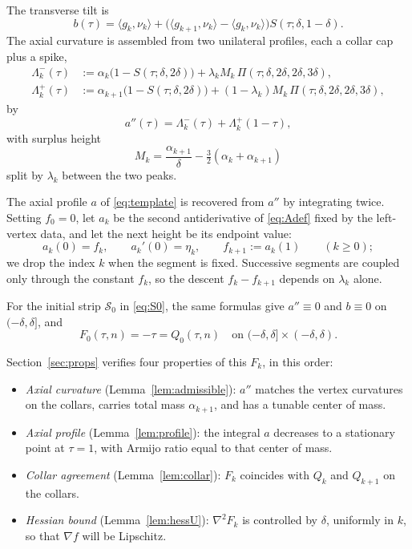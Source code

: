 \documentclass[11pt]{article}
\newcommand{\ip}[2]{\langle #1,#2\rangle}
\begin{document}
The transverse tilt is
\begin{equation}
\label{eq:btrans}
b(\tau) = \ip{g_k}{\nu_k} + \bigl(\ip{g_{k+1}}{\nu_k} - \ip{g_k}{\nu_k}\bigr)
S(\tau; \delta, 1-\delta).
\end{equation}
The axial curvature is assembled from two unilateral profiles, each a collar cap plus a spike,
\begin{align}
\Lambda_k^-(\tau) &:= \alpha_k\bigl(1 - S(\tau; \delta, 2\delta)\bigr) + \lambda_k M_k\,\Pi(\tau; \delta, 2\delta, 2\delta, 3\delta), \label{eq:Lambdaminus} \\
\Lambda_k^+(\tau) &:= \alpha_{k+1}\bigl(1 - S(\tau; \delta, 2\delta)\bigr) + (1-\lambda_k) M_k\,\Pi(\tau; \delta, 2\delta, 2\delta, 3\delta), \label{eq:Lambdaplus}
\end{align}
by
\begin{equation}
\label{eq:Adef}
a''(\tau) = \Lambda_k^-(\tau) + \Lambda_k^+(1-\tau),
\end{equation}
with surplus height
\begin{equation}
\label{eq:Msum}
M_k = \frac{\alpha_{k+1}}{\delta} - \tfrac32(\alpha_k + \alpha_{k+1})
\end{equation}
split by $\lambda_k$ between the two peaks.

The axial profile $a$ of \eqref{eq:template} is recovered from $a''$ by integrating twice. Setting $f_0=0$, let $a_k$ be the second antiderivative of \eqref{eq:Adef} fixed by the left-vertex data, and let the next height be its endpoint value:
\begin{equation}
\label{eq:adef}
a_k(0)=f_k, \qquad a_k'(0)=\eta_k, \qquad f_{k+1}:=a_k(1) \qquad (k\ge0);
\end{equation}
we drop the index $k$ when the segment is fixed. Successive segments are coupled only through the constant $f_k$, so the descent $f_k-f_{k+1}$ depends on $\lambda_k$ alone.

For the initial strip $\mathcal S_0$ in \eqref{eq:S0}, the same formulas give $a''\equiv0$ and $b\equiv0$ on $(-\delta,\delta]$, and
\begin{equation}
\label{eq:Q0collar}
F_0(\tau, n) = -\tau = Q_0(\tau, n) \quad\text{on } (-\delta, \delta] \times (-\delta, \delta).
\end{equation}

Section~\ref{sec:props} verifies four properties of this $F_k$, in this order:
\begin{itemize}
\item \emph{Axial curvature} (Lemma~\ref{lem:admissible}): $a''$ matches the vertex curvatures on the collars, carries total mass $\alpha_{k+1}$, and has a tunable center of mass.
\item \emph{Axial profile} (Lemma~\ref{lem:profile}): the integral $a$ decreases to a stationary point at $\tau=1$, with Armijo ratio equal to that center of mass.
\item \emph{Collar agreement} (Lemma~\ref{lem:collar}): $F_k$ coincides with $Q_k$ and $Q_{k+1}$ on the collars.
\item \emph{Hessian bound} (Lemma~\ref{lem:hessU}): $\nabla^2 F_k$ is controlled by $\delta$, uniformly in $k$, so that $\nabla f$ will be Lipschitz.
\end{itemize}
\end{document}

